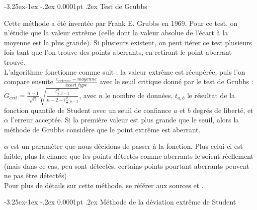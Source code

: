 \documentclass[a4paper,12pt]{article} %
\makeatletter
\renewcommand\paragraph{\@startsection{paragraph}{4}{\z@}%
                                      {-3.25ex\@plus -1ex \@minus -.2ex}%
                                      {0.0001pt \@plus .2ex}%
                                      {\normalfont\normalsize\bfseries}}
\makeatother
\begin{document}
					\paragraph{Test de Grubbs}
                        					
                        Cette méthode a été inventée par Frank E. Grubbs en 1969. Pour ce test, on n’étudie que la valeur extrême (celle dont la valeur absolue de l’écart à la moyenne est la plus grande). Si plusieurs existent, on peut itérer ce test plusieurs fois tant que l'on trouve des points aberrants, en retirant le point aberrant trouvé. \\
                        
                        L'algorithme fonctionne comme suit : la valeur extrême est récupérée, puis l'on compare ensuite $\frac{v_{extrême}-moyenne}{écart\_type}$ avec le seuil critique donné par le test de Grubbs : $G_{crit} = \frac{n-1}{\sqrt{n}}\sqrt{\frac{t^2_{\frac{\alpha}{n},n-2}}{n-2+t^2_{\frac{\alpha}{n},n-2}}}$, avec $n$ le nombre de données, $t_{a,b}$ le résultat de la fonction quantile de Student avec un seuil de conﬁance $a$ et $b$ degrés de liberté, et $\alpha$ l’erreur acceptée. Si la première valeur est plus grande que le seuil, alors la méthode de Grubbs considère que le point extrême est aberrant.
                        
                        $\alpha$ est un paramètre que nous décidons de passer à la fonction. Plus celui-ci est faible, plus la chance que les points détectés comme aberrants le soient réellement (mais dans ce cas, peu sont détectés, certains points pourtant aberrants peuvent ne pas être détectés)\\
                        
                        Pour plus de détails sur cette méthode, se référer aux sources \cite{Grubbs1} et \cite{Grubbs2}.


					\paragraph{Méthode de la déviation extrême de Student}
					
\end{document}
